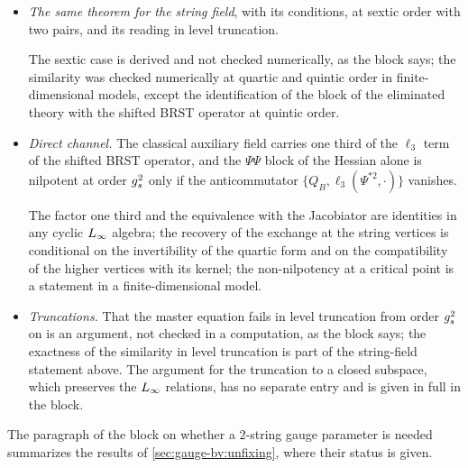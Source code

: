 \begin{itemize}
  \item \emph{The same theorem for the string field}, with its conditions, at sextic order with two pairs, and its reading in level truncation.


    The sextic case is derived and not checked numerically, as the block says; the similarity was checked numerically at quartic and quintic order in finite-dimensional models, except the identification of the block of the eliminated theory with the shifted BRST operator at quintic order.

  \item \emph{Direct channel.} The classical auxiliary field carries one third of the $\ell_3$ term of the shifted BRST operator, and the $\Psi \Psi$ block of the Hessian alone is nilpotent at order $g_s^2$ only if the anticommutator $\{ Q_B, \ell_3(\Psi^{*2}, \cdot) \}$ vanishes.


    The factor one third and the equivalence with the Jacobiator are identities in any cyclic $L_\infty$ algebra; the recovery of the exchange at the string vertices is conditional on the invertibility of the quartic form and on the compatibility of the higher vertices with its kernel; the non-nilpotency at a critical point is a statement in a finite-dimensional model.

  \item \emph{Truncations.} That the master equation fails in level truncation from order $g_s^2$ on is an argument, not checked in a computation, as the block says; the exactness of the similarity in level truncation is part of the string-field statement above.
    The argument for the truncation to a closed subspace, which preserves the $L_\infty$ relations, has no separate entry and is given in full in the block.
\end{itemize}

The paragraph of the block on whether a $2$-string gauge parameter is needed summarizes the results of \cref{sec:gauge-bv:unfixing}, where their status is given.

